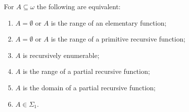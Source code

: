 For $A \subseteq \omega$ the following are equivalent:

\begin{enumerate}
\item[(i)] $A = \emptyset$ or $A$ is the range of an elementary function;
\item[(ii)] $A = \emptyset$ or $A$ is the range of a primitive recursive function;
\item[(iii)] $A$ is recursively enumerable;
\item[(iv)] $A$ is the range of a partial recursive function;
\item[(v)] $A$ is the domain of a partial recursive function;
\item[(vi)] $A \in \Sigma_1$.
\end{enumerate}
